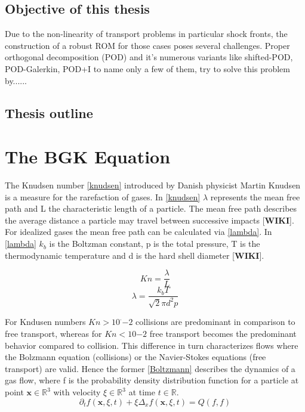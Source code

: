 \documentclass[12pt, a4paper]{article}
\begin{document}
\subsection{Objective of this thesis}
Due to the non-linearity of transport problems in particular shock fronts, the construction of a robust ROM for those cases poses several challenges. Proper orthogonal decomposition (POD) and it's numerous variants like shifted-POD\cite{bibid}, POD-Galerkin\cite{bibid}, POD+I \cite{bibid} to name only a few of them, try to solve this problem by......
\subsection{Thesis outline}
\section{The BGK Equation}
The Knudsen number \cref{knudsen} introduced by Danish physicist Martin Knudsen is a measure for the rarefaction of gases. In \cref{knudsen} $\lambda$ represents the mean free path and L the characteristic length \cite{Bernard} of a particle. The mean free path  describes the average distance a particle may travel between successive impacts [\textbf{WIKI}]. For idealized gases the mean free path can be calculated via \cref{lambda}. In \cref{lambda} $k_b$ is the Boltzman constant, p is the total pressure, T is the thermodynamic temperature and d is the hard shell diameter [\textbf{WIKI}]. 
\begin{multicols}{2}
	\begin{equation}
		Kn = \frac{\lambda}{L}
		\label{knudsen}
	\end{equation}
	\begin{equation}
		\lambda = \frac{k_bT}{\sqrt{2}\pi d^2p}
		\label{lambda}
	\end{equation}
\end{multicols}\noindent
For Kndusen numbers $Kn > 10^·{-2}$ collisions are predominant in comparison to free transport, whereas for $Kn < 10{-2}$ free transport becomes the predominant behavior compared to collision\cite{Bernard}. This difference in turn characterizes flows where the Bolzmann equation (collisions) or the Navier-Stokes equations (free transport) are valid. Hence the former \cref{Boltzmann} describes the dynamics of a gas flow, where f is the probability density distribution function for a particle at point $\textbf{x} \in \mathbb{R}^3$ with velocity $\xi \in \mathbb{R}^3$ at time $t \in \mathbb{R}$. 
\begin{equation}
	\partial_t f(\textbf{x}, \xi, t) + \xi \Delta_x f(\textbf{x},\xi,t) = Q(f,f)
	\label{Boltzmann}
\end{equation}
\end{document}
